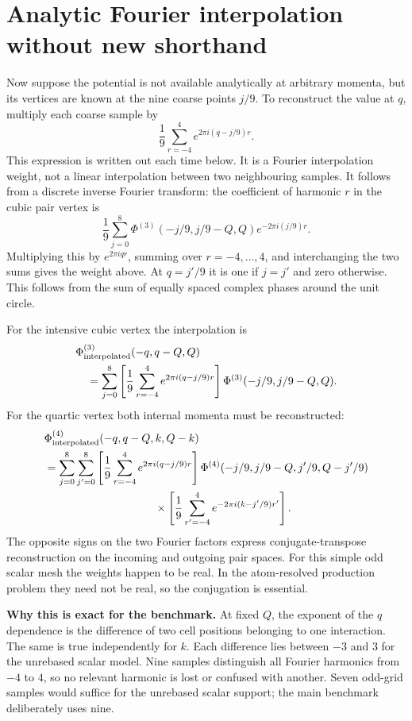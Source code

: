 \documentclass[11pt,a4paper]{article}
\newcommand{\pageheading}[1]{\clearpage\section{#1}}
\begin{document}
\pageheading{Analytic Fourier interpolation without new shorthand}
Now suppose the potential is not available analytically at arbitrary momenta,
but its vertices are known at the nine coarse points $j/9$. To reconstruct the
value at $q$, multiply each coarse sample by
\begin{equation}
 \frac19\sum_{r=-4}^{4}e^{2\pi i(q-j/9)r}.
\end{equation}
This expression is written out each time below. It is a Fourier interpolation
weight, not a linear interpolation between two neighbouring samples.
It follows from a discrete inverse Fourier transform: the coefficient of
harmonic $r$ in the cubic pair vertex is
\begin{equation}
 \frac19\sum_{j=0}^{8}
 \Phi^{(3)}(-j/9,j/9-Q,Q)e^{-2\pi i(j/9)r}.
\end{equation}
Multiplying this by $e^{2\pi iqr}$, summing over $r=-4,\ldots,4$,
and interchanging the two sums gives the weight above.
At $q=j'/9$ it is one if $j=j'$ and zero otherwise. This follows from the sum
of equally spaced complex phases around the unit circle.

For the intensive cubic vertex the interpolation is
\begin{align}
 &\Phi^{(3)}_{\rm interpolated}(-q,q-Q,Q)\notag\\
 &\quad=\sum_{j=0}^{8}
 \left[\frac19\sum_{r=-4}^{4}e^{2\pi i(q-j/9)r}\right]
 \Phi^{(3)}(-j/9,j/9-Q,Q).
\end{align}
For the quartic vertex both internal momenta must be reconstructed:
\begin{align}
 &\Phi^{(4)}_{\rm interpolated}(-q,q-Q,k,Q-k)\notag\\
 &=\sum_{j=0}^{8}\sum_{j'=0}^{8}
 \left[\frac19\sum_{r=-4}^{4}e^{2\pi i(q-j/9)r}\right]
 \Phi^{(4)}(-j/9,j/9-Q,j'/9,Q-j'/9)\notag\\
 &\hspace{35mm}\times
 \left[\frac19\sum_{r'=-4}^{4}e^{-2\pi i(k-j'/9)r'}\right].
\end{align}
The opposite signs on the two Fourier factors express conjugate-transpose
reconstruction on the incoming and outgoing pair spaces. For this simple
odd scalar mesh the weights happen to be real. In the atom-resolved production
problem they need not be real, so the conjugation is essential.

\textbf{Why this is exact for the benchmark.} At fixed $Q$, the exponent of the
$q$ dependence is the difference of two cell positions belonging to one
interaction. The same is true independently for $k$. Each difference lies
between $-3$ and $3$ for the unrebased scalar model. Nine samples distinguish
all Fourier harmonics from $-4$ to $4$, so no relevant harmonic is lost or
confused with another. Seven odd-grid samples would suffice for the unrebased
scalar support; the main benchmark deliberately uses nine.
\end{document}
